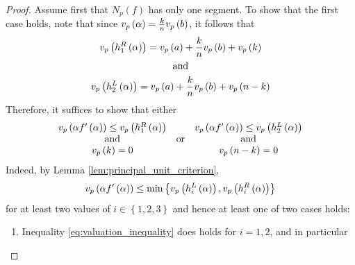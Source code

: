 \documentclass[../main.tex]{subfiles}
\begin{document}
\begin{proof}
  Assume first that $N_p\left( f \right)$ has only one segment.
  To show that the first case holds, note that since $v_p\left( \alpha \right) = \frac{k}{n}v_p\left( b \right)$, it follows that
  \begin{gather*}
    v_p\left( h_{1}^R\left( \alpha \right) \right) 
    = 
    v_p\left( a \right) + \frac{k}{n}v_p\left( b \right) + v_p\left( k \right)
    \\ 
    \quad \text{and} \quad
    \\
    v_p\left( h_{2}^L\left( \alpha \right) \right) 
    = 
    v_p\left( a \right) + \frac{k}{n}v_p\left( b \right) + v_p\left( n - k \right)
  \end{gather*}
  Therefore, it suffices to show that either
  \begin{align}
    \label{eq:sufficient_condition}
    \begin{matrix}
      v_p\left( \alpha f'\left( \alpha \right) \right) \leq v_p\left( h_{1}^R\left( \alpha \right) \right) \\
      \text{and} \\
      v_p\left( k \right) = 0
    \end{matrix}
    \quad \text{or} \quad
    \begin{matrix}
      v_p\left( \alpha f'\left( \alpha \right) \right) \leq v_p\left( h_{2}^L\left( \alpha \right) \right) \\
      \text{and} \\
      v_p\left( n - k \right) = 0
    \end{matrix}
  \end{align}
  Indeed, by Lemma \ref{lem:principal_unit_criterion}, 
  \begin{align}
    \label{eq:valuation_inequality} 
    v_p\left( \alpha f'\left( \alpha \right) \right) 
    \leq 
    \min\left\{ v_p\left( h_{i}^L\left( \alpha \right) \right), v_p\left( h_{i}^R\left( \alpha \right) \right) \right\}
  \end{align}
  for at least two values of $i \in \left\{ 1, 2, 3 \right\}$ and hence at least one of two cases holds:
  \begin{enumerate}
    \item Inequality \ref{eq:valuation_inequality} does holds for $i = 1,2$, and in particular 

\end{enumerate}
\end{proof}
\end{document}
